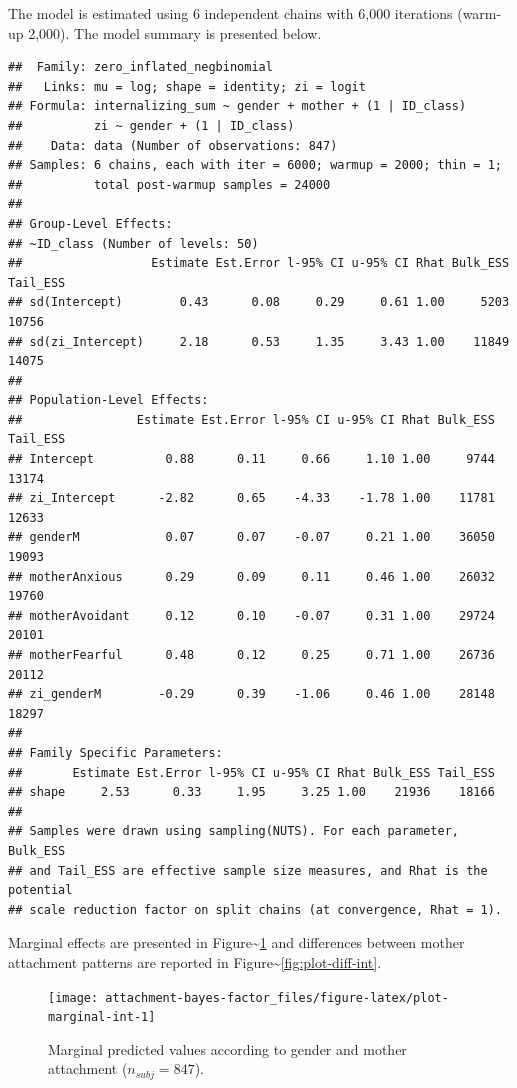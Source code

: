 \documentclass[
]{book}
\begin{document}
The model is estimated using 6 independent chains with 6,000 iterations (warm-up 2,000). The model summary is presented below.

\begin{verbatim}
##  Family: zero_inflated_negbinomial 
##   Links: mu = log; shape = identity; zi = logit 
## Formula: internalizing_sum ~ gender + mother + (1 | ID_class) 
##          zi ~ gender + (1 | ID_class)
##    Data: data (Number of observations: 847) 
## Samples: 6 chains, each with iter = 6000; warmup = 2000; thin = 1;
##          total post-warmup samples = 24000
## 
## Group-Level Effects: 
## ~ID_class (Number of levels: 50) 
##                  Estimate Est.Error l-95% CI u-95% CI Rhat Bulk_ESS Tail_ESS
## sd(Intercept)        0.43      0.08     0.29     0.61 1.00     5203    10756
## sd(zi_Intercept)     2.18      0.53     1.35     3.43 1.00    11849    14075
## 
## Population-Level Effects: 
##                Estimate Est.Error l-95% CI u-95% CI Rhat Bulk_ESS Tail_ESS
## Intercept          0.88      0.11     0.66     1.10 1.00     9744    13174
## zi_Intercept      -2.82      0.65    -4.33    -1.78 1.00    11781    12633
## genderM            0.07      0.07    -0.07     0.21 1.00    36050    19093
## motherAnxious      0.29      0.09     0.11     0.46 1.00    26032    19760
## motherAvoidant     0.12      0.10    -0.07     0.31 1.00    29724    20101
## motherFearful      0.48      0.12     0.25     0.71 1.00    26736    20112
## zi_genderM        -0.29      0.39    -1.06     0.46 1.00    28148    18297
## 
## Family Specific Parameters: 
##       Estimate Est.Error l-95% CI u-95% CI Rhat Bulk_ESS Tail_ESS
## shape     2.53      0.33     1.95     3.25 1.00    21936    18166
## 
## Samples were drawn using sampling(NUTS). For each parameter, Bulk_ESS
## and Tail_ESS are effective sample size measures, and Rhat is the potential
## scale reduction factor on split chains (at convergence, Rhat = 1).
\end{verbatim}

Marginal effects are presented in Figure\textasciitilde\ref{fig:plot-marginal-int} and differences between mother attachment patterns are reported in Figure\textasciitilde\ref{fig:plot-diff-int}.

\begin{figure}

{\centering \texttt{[image: attachment-bayes-factor\_files/figure-latex/plot-marginal-int-1]} 

}

\caption{Marginal predicted values according to gender and mother attachment ($n_{subj} = 847$).}\label{fig:plot-marginal-int}
\end{figure}
\end{document}
